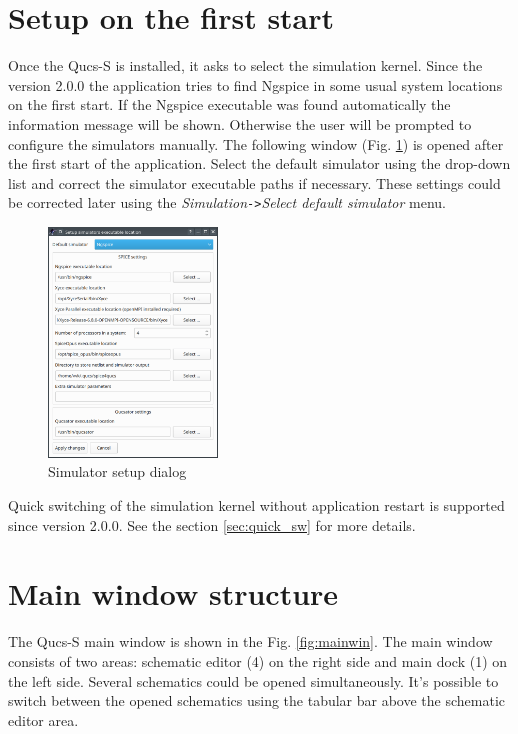 \documentclass[a4paper,12pt]{article}
\begin{document}
\section{Setup on the first start}

Once the Qucs-S is installed, it asks to select the simulation kernel. Since the version 2.0.0 the application tries to find Ngspice in some usual system locations on the first start. If the Ngspice executable was found automatically the information message will be shown. Otherwise the user will be prompted to configure the simulators manually. The following window (Fig. \ref{fig:sim_setup}) is opened after the first start  of the application. Select the default simulator using the drop-down list and correct the simulator executable paths if necessary. These settings could be corrected later using the \textit{Simulation}\verb|->|\textit{Select default simulator} menu. 

\begin{figure}[!ht]
  \begin{center}
    \includegraphics[width=0.4\textwidth]{img/sim_setup.png}
  \end{center}
  \caption{Simulator setup dialog} \label{fig:sim_setup}
\end{figure}

Quick switching of the simulation kernel without application restart is supported since version 2.0.0. See the section \ref{sec:quick_sw} for more details.

\section{Main window structure}


The Qucs-S main window is shown in the Fig. \ref{fig:mainwin}. The main window consists of two areas: schematic editor (4) on the right side and main dock (1) on the left side. Several schematics could be opened simultaneously. It's possible to switch between the opened schematics using the tabular bar above the schematic editor area.    
\end{document}

